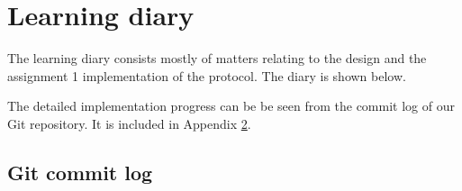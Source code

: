 \documentclass[a4paper]{article}
\begin{document}
\section{Learning diary}
The learning diary consists mostly of matters relating to the design and the
assignment 1 implementation of the protocol. The diary is shown below.

The detailed implementation progress can be be seen from the commit log of our
Git repository. It is included in Appendix \ref{lst:commit_log}.



\clearpage
\begin{appendices}
  \section{Git commit log}\label{lst:commit_log}
  
\end{appendices}
\end{document}
